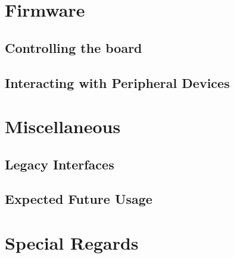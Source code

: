 \documentclass[letterpaper, 12pt]{article}
\begin{document}
\section{Firmware}
\subsection{Controlling the board}
\pagebreak
\subsection{Interacting with Peripheral Devices}
\pagebreak

\section{Miscellaneous}
\subsection{Legacy Interfaces}
\pagebreak
\subsection{Expected Future Usage}
\pagebreak

\section{Special Regards}
\pagebreak
\end{document}
